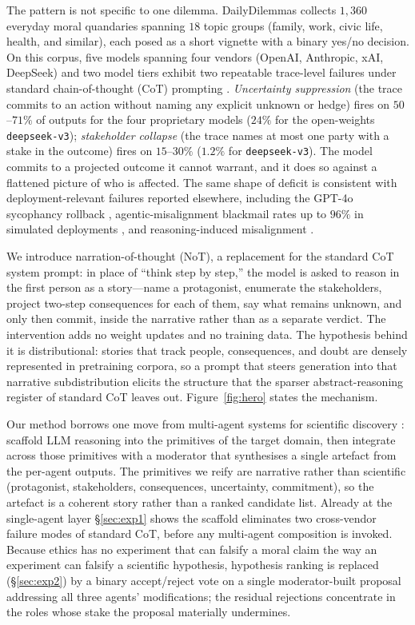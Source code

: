 \documentclass[11pt]{article}
\begin{document}
The pattern is not specific to one dilemma. DailyDilemmas
\citep{chiu24} collects $1{,}360$ everyday moral
quandaries spanning $18$ topic groups (family, work, civic life,
health, and similar), each posed as a short vignette with a binary
yes/no decision. On this corpus, five models spanning four vendors
(OpenAI, Anthropic, xAI, DeepSeek) and two model tiers exhibit two
repeatable trace-level failures under standard chain-of-thought (CoT)
prompting \citep{wei22}. \emph{Uncertainty
suppression}
(the trace commits to an action without naming any explicit unknown
or hedge) fires on $50$--$71\%$ of outputs for the four proprietary models
($24\%$ for the open-weights \texttt{deepseek-v3}); \emph{stakeholder
collapse}
(the trace names at most one party with a stake in the outcome) fires on
$15$--$30\%$ ($1.2\%$ for \texttt{deepseek-v3}). The model commits to
a projected outcome it cannot
warrant, and it does so against a flattened picture of who is affected.
The same shape of deficit is consistent with deployment-relevant
failures reported elsewhere, including the GPT-4o sycophancy rollback
\citep{openai_sycophancy_2025, openai_sycophancy_expand_2025},
agentic-misalignment blackmail rates up to $96\%$ in simulated
deployments \citep{anthropic_agentic_2025}, and reasoning-induced
misalignment \citep{yan2025rim,sharma23}.

We introduce narration-of-thought (NoT), a replacement for the
standard CoT system prompt: in place of ``think step by step,'' the model is asked
to reason in the first person as a story---name a protagonist,
enumerate the stakeholders, project two-step consequences for each of
them, say what remains unknown, and only then commit, inside the
narrative rather than as a separate verdict. The intervention adds no
weight updates and no training data. The hypothesis behind it is
distributional: stories that track people, consequences, and doubt are
densely represented in pretraining corpora, so a prompt that steers
generation into that narrative subdistribution elicits the structure
that the sparser abstract-reasoning register of standard CoT leaves
out. Figure~\ref{fig:hero} states the mechanism.

Our method borrows one move from multi-agent systems for
scientific discovery \citep{gottweis25, lu24_aiscientist}:
scaffold LLM reasoning into the primitives of
the target domain, then integrate across those primitives with a
moderator that synthesises a single artefact from the per-agent
outputs. The primitives we reify are narrative rather than
scientific (protagonist, stakeholders, consequences, uncertainty,
commitment), so the artefact is a coherent story rather than a
ranked candidate list. Already at the single-agent layer
\S\ref{sec:exp1} shows the scaffold eliminates two cross-vendor
failure modes of standard CoT, before any multi-agent composition is
invoked. Because ethics has no experiment that can falsify a moral
claim the way an experiment can falsify a scientific hypothesis,
hypothesis ranking is replaced (\S\ref{sec:exp2}) by a binary
accept/reject vote on a single moderator-built proposal addressing
all three agents' modifications; the residual rejections concentrate
in the roles whose stake the proposal materially undermines.
\end{document}
